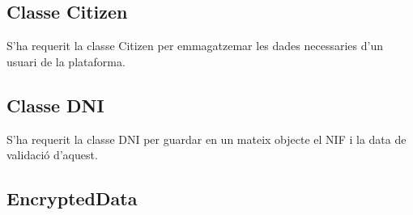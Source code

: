 \documentclass[12pt, letterpaper]{article}
\begin{document}
\subsection{Classe Citizen}
\label{citizen}
S'ha requerit la classe Citizen per emmagatzemar les dades necessaries d'un usuari de la plataforma.

\subsection{Classe DNI}
\label{dni}
S'ha requerit la classe DNI per guardar en un mateix objecte el NIF i la data de validació d'aquest.

\subsection{EncryptedData}
\label{encyptedData}
\end{document}
